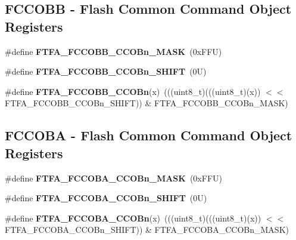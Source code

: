 \subsection*{F\+C\+C\+O\+BB -\/ Flash Common Command Object Registers}
\begin{DoxyCompactItemize}
\item 
\mbox{\label{group___f_t_f_a___register___masks_ga286640e4b2ec8195c749e88ef23d6e9b}} 
\#define {\bfseries F\+T\+F\+A\+\_\+\+F\+C\+C\+O\+B\+B\+\_\+\+C\+C\+O\+Bn\+\_\+\+M\+A\+SK}~(0x\+F\+F\+U)
\item 
\mbox{\label{group___f_t_f_a___register___masks_gab9fc4173503ca47be2b4a04ec4635905}} 
\#define {\bfseries F\+T\+F\+A\+\_\+\+F\+C\+C\+O\+B\+B\+\_\+\+C\+C\+O\+Bn\+\_\+\+S\+H\+I\+FT}~(0\+U)
\item 
\mbox{\label{group___f_t_f_a___register___masks_gae536fccc4b97613a7a06a9889fa0ad7e}} 
\#define {\bfseries F\+T\+F\+A\+\_\+\+F\+C\+C\+O\+B\+B\+\_\+\+C\+C\+O\+Bn}(x)~(((uint8\+\_\+t)(((uint8\+\_\+t)(x)) $<$$<$ F\+T\+F\+A\+\_\+\+F\+C\+C\+O\+B\+B\+\_\+\+C\+C\+O\+Bn\+\_\+\+S\+H\+I\+FT)) \& F\+T\+F\+A\+\_\+\+F\+C\+C\+O\+B\+B\+\_\+\+C\+C\+O\+Bn\+\_\+\+M\+A\+SK)
\end{DoxyCompactItemize}
\subsection*{F\+C\+C\+O\+BA -\/ Flash Common Command Object Registers}
\begin{DoxyCompactItemize}
\item 
\mbox{\label{group___f_t_f_a___register___masks_gaa0a0a7f61d12d4ec0fd9ee2c9117cd03}} 
\#define {\bfseries F\+T\+F\+A\+\_\+\+F\+C\+C\+O\+B\+A\+\_\+\+C\+C\+O\+Bn\+\_\+\+M\+A\+SK}~(0x\+F\+F\+U)
\item 
\mbox{\label{group___f_t_f_a___register___masks_ga7ed8fee49581acc92a76f451786a6723}} 
\#define {\bfseries F\+T\+F\+A\+\_\+\+F\+C\+C\+O\+B\+A\+\_\+\+C\+C\+O\+Bn\+\_\+\+S\+H\+I\+FT}~(0\+U)
\item 
\mbox{\label{group___f_t_f_a___register___masks_gab15606625d07da7c18f59be622adf32a}} 
\#define {\bfseries F\+T\+F\+A\+\_\+\+F\+C\+C\+O\+B\+A\+\_\+\+C\+C\+O\+Bn}(x)~(((uint8\+\_\+t)(((uint8\+\_\+t)(x)) $<$$<$ F\+T\+F\+A\+\_\+\+F\+C\+C\+O\+B\+A\+\_\+\+C\+C\+O\+Bn\+\_\+\+S\+H\+I\+FT)) \& F\+T\+F\+A\+\_\+\+F\+C\+C\+O\+B\+A\+\_\+\+C\+C\+O\+Bn\+\_\+\+M\+A\+SK)
\end{DoxyCompactItemize}
